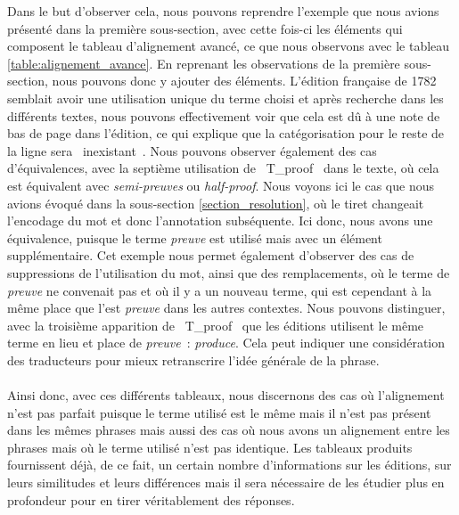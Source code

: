 Dans le but d’observer cela, nous pouvons reprendre l’exemple que nous avions présenté dans la première sous-section, avec cette fois-ci les éléments qui composent le tableau d’alignement avancé, ce que nous observons avec le tableau \ref{table:alignement_avance}.
En reprenant les observations de la première sous-section, nous pouvons donc y ajouter des éléments. L’édition française de 1782 semblait avoir une utilisation unique du terme choisi et après recherche dans les différents textes, nous pouvons effectivement voir que cela est dû à une note de bas de page dans l’édition, ce qui explique que la catégorisation pour le reste de la ligne sera \og~inexistant~\fg{}. Nous pouvons observer également des cas d’équivalences, avec la septième utilisation de \og~T\_proof~\fg{} dans le texte, où cela est équivalent avec \textit{semi-preuves} ou \textit{half-proof}. Nous voyons ici le cas que nous avions évoqué dans la sous-section \ref{section_resolution}, où le tiret changeait l’encodage du mot et donc l’annotation subséquente. Ici donc, nous avons une équivalence, puisque le terme \textit{preuve} est utilisé mais avec un élément supplémentaire. Cet exemple nous permet également d’observer des cas de suppressions de l’utilisation du mot, ainsi que des remplacements, où le terme de \textit{preuve} ne convenait pas et où il y a un nouveau terme, qui est cependant à la même place que l’est \textit{preuve} dans les autres contextes. Nous pouvons distinguer, avec la troisième apparition de \og~T\_proof~\fg{} que les éditions utilisent le même terme en lieu et place de \textit{preuve}~: \textit{produce}. Cela peut indiquer une considération des traducteurs pour mieux retranscrire l’idée générale de la phrase.

\paragraph{}Ainsi donc, avec ces différents tableaux, nous discernons des cas où l’alignement n’est pas parfait puisque le terme utilisé est le même mais il n’est pas présent dans les mêmes phrases mais aussi des cas où nous avons un alignement entre les phrases mais où le terme utilisé n’est pas identique. Les tableaux produits fournissent déjà, de ce fait, un certain nombre d’informations sur les éditions, sur leurs similitudes et leurs différences mais il sera nécessaire de les étudier plus en profondeur pour en tirer véritablement des réponses.

